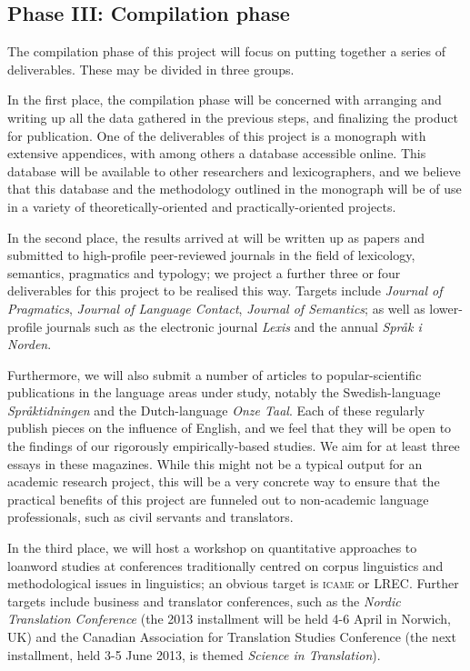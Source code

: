 \documentclass[a4paper]{article}
\begin{document}

\subsection{Phase III: Compilation phase}

The compilation phase of this project will focus on putting together a series of deliverables. These may be divided in three groups.

In the first place, the compilation phase will be concerned with arranging and writing up all the data gathered in the previous steps, and finalizing the product for publication. One of the deliverables of this project is a monograph with extensive appendices, with among others a database accessible online. This database will be available to other researchers and lexicographers, and we believe that this database and the methodology outlined in the monograph will be of use in a variety of theoretically-oriented and practically-oriented projects.

In the second place, the results arrived at will be written up as papers and submitted to high-profile peer-reviewed journals in the field of lexicology, semantics, pragmatics and typology; we project a further three or four deliverables for this project to be realised this way. Targets include \emph{Journal of Pragmatics}, \emph{Journal of Language Contact}, \emph{Journal of Semantics}; as well as lower-profile journals such as the electronic journal \emph{Lexis} and the annual \emph{Spr\aa k i Norden}.

Furthermore, we will also submit a number of articles to popular-scientific publications in the language areas under study, notably the Swedish-language \emph{Spr\aa ktidningen} and the Dutch-language \emph{Onze Taal}.
Each of these regularly publish pieces on the influence of English, and we feel that they will be open to the findings of our rigorously empirically-based studies. We aim for at least three essays in these magazines. While this might not be a typical output for an academic research project, this will be a very concrete way to ensure that the practical benefits of this project are funneled out to non-academic language professionals, such as civil servants and translators.

In the third place, we will host a workshop on quantitative approaches to loanword studies at conferences traditionally centred on corpus linguistics and methodological issues in linguistics; an obvious target is \textsc{icame} or LREC. Further targets include business and translator conferences, such as the \emph{Nordic Translation Conference} (the 2013 installment will be held 4-6 April in Norwich, UK) and the Canadian Association for Translation Studies Conference (the next installment, held 3-5 June 2013, is themed \emph{Science in Translation}). 
\end{document}
